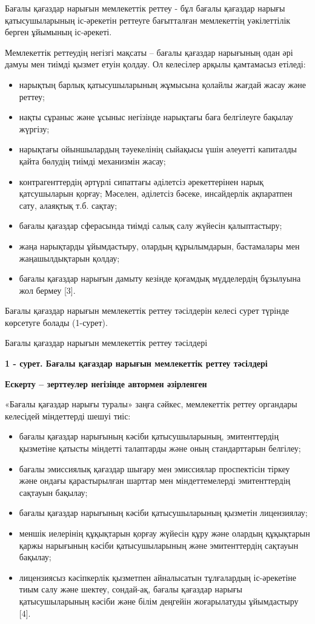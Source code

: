 Бағалы қағаздар нарығын мемлекеттік реттеу - бұл бағалы қағаздар нарығы
қатысушыларының іс-әрекетін реттеуге бағытталған мемлекеттің
уәкілеттілік берген ұйымының іс-әрекеті.

Мемлекеттік реттеудің негізгі мақсаты -- бағалы қағаздар нарығының одан
әрі дамуы мен тиімді қызмет етуін қолдау. Ол келесілер арқылы қамтамасыз
етіледі:

\begin{itemize}
\item
  нарықтың барлық қатысушыларының жұмысына қолайлы жағдай жасау және
  реттеу;
\item
  нақты сұраныс және ұсыныс негізінде нарықтағы баға белгілеуге бақылау
  жүргізу;
\item
  нарықтағы ойыншылардың тәуекелінің сыйақысы үшін әлеуетті капиталды
  қайта бөлудің тиімді механизмін жасау;
\item
  контрагенттердің әртүрлі сипаттағы әділетсіз әрекеттерінен нарық
  қатсушыларын қорғау; Мәселен, әділетсіз бәсеке, инсайдерлік ақпаратпен
  сату, алаяқтық т.б. сақтау;
\item
  бағалы қағаздар сферасында тиімді салық салу жүйесін қалыптастыру;
\item
  жаңа нарықтарды ұйымдастыру, олардың құрылымдарын, бастамалары мен
  жаңашылдықтарын қолдау;
\item
  бағалы қағаздар нарығын дамыту кезінде қоғамдық мүдделердің бұзылуына
  жол бермеу {[}3{]}.
\end{itemize}

Бағалы қағаздар нарығын мемлекеттік реттеу тәсілдерін келесі сурет
түрінде көрсетуге болады (1-сурет).

Бағалы қағаздар нарығын мемлекеттік реттеу тәсілдері

{\bfseries 1 - сурет. Бағалы қағаздар нарығын мемлекеттік реттеу тәсілдері}

{\bfseries Ескерту -- зерттеулер негізінде автормен әзірленген}

«Бағалы қағаздар нарығы туралы» заңға сәйкес, мемлекеттік реттеу
органдары келесідей міндеттерді шешуі тиіс:

\begin{itemize}
\item
  бағалы қағаздар нарығының кәсіби қатысушыларының, эмитенттердің
  қызметіне қатысты міндетті талаптарды және оның стандарттарын
  белгілеу;
\item
  бағалы эмиссиялық қағаздар шығару мен эмиссиялар проспектісін тіркеу
  және ондағы қарастырылған шарттар мен міндеттемелерді эмитенттердің
  сақтауын бақылау;
\item
  бағалы қағаздар нарығының кәсіби қатысушыларының қызметін лицензиялау;
\item
  меншік иелерінің құқықтарын қорғау жүйесін құру және олардың
  құқықтарын қаржы нарығының кәсіби қатысушыларының және эмитенттердің
  сақтауын бақылау;
\item
  лицензиясыз кәсіпкерлік қызметпен айналысатын тұлғалардың іс-әрекетіне
  тиым салу және шектеу, сондай-ақ, бағалы қағаздар нарығы
  қатысушыларының кәсіби және білім деңгейін жоғарылатуды ұйымдастыру
  {[}4{]}.
\end{itemize}

